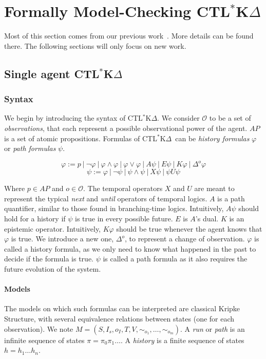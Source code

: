\documentclass[dvipsnames]{acmart}
\def\ctlskd{CTL$^{*}$K$\Delta$}
\def\A{\mathit{A}}
\def\E{\mathit{E}}
\def\U{\mathit{U}}
\def\X{\mathit{X}}
\def\K{\mathit{K}}
\def\D#1{\Delta^{#1}}
\def\eqstate#1{\sim_{#1}}
\begin{document}
\section{Formally Model-Checking \ctlskd}
Most of this section comes from our previous work~\cite{KR18,internship}. More details can be found there.
The following sections will only focus on new work.

\subsection{Single agent \ctlskd}
\subsubsection{Syntax}

We begin by introducing the syntax of \ctlskd. 
We consider $\mathcal{O}$ to be a set of \textit{observations}, that each represent a possible observational power of the agent. $\mathit{AP}$ is a set of atomic propositions.
Formulas of \ctlskd\ can be \textit{history formulas} $\varphi$ or \textit{path formulas} $\psi$.

$$\varphi := p ~|~ \neg \varphi ~|~ \varphi\wedge\varphi ~|~ \varphi\vee\varphi ~|~ \A\psi ~|~ \E\psi ~|~ \K\varphi ~|~ \D{o}\varphi$$
$$\psi := \varphi ~|~ \neg\psi ~|~ \psi\wedge\psi ~|~ \X\psi ~|~ \psi\U\psi$$

Where $p\in\mathit{AP}$ and $o\in\mathcal{O}$.
The temporal operators $\X$ and $\U$ are meant to represent the typical \textit{next} and \textit{until} operators of temporal logics.
$\A$ is a path quantifier, similar to those found in branching-time logics. Intuitively, $\A\psi$ should hold for a history if $\psi$ is true in every possible future. $\E$ is $\A$'s dual.
$\K$ is an epistemic operator. Intuitively, $\K\varphi$ should be true whenever the agent knows that $\varphi$ is true. We introduce a new one, $\D{o}$, to represent a change of observation.
$\varphi$ is called a history formula, as we only need to know what happened in the past to decide if the formula is true. $\psi$ is called a path formula as it also requires the future evolution of the system.

\paragraph{Models}
The models on which such formulas can be interpreted are classical Kripke Structure, with several equivalence relations between states (one for each observation). We note $M=(S,I_s,o_I,T,V,\eqstate{o_1},\dots,\eqstate{o_m})$.
A \textit{run} or \textit{path} is an infinite sequence of states $\pi=\pi_0\pi_1\dots$. A \textit{history} is a finite sequence of states $h=h_1\dots h_n$.
\end{document}
